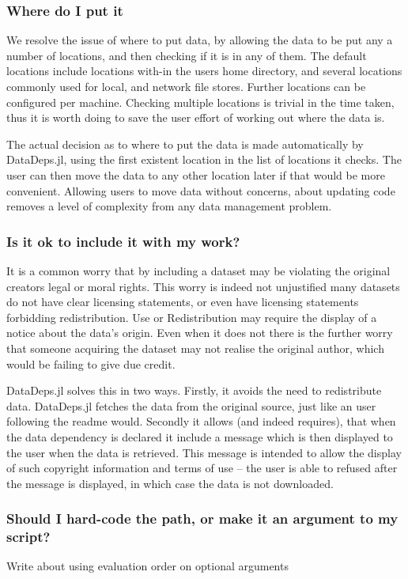 \documentclass{jors}
\begin{document}
\subsubsection{Where do I put it}
We resolve the issue of where to put data, by allowing the data to be put any a number of locations, and then checking if it is in any of them.
The default locations include locations with-in the users home directory, and several locations commonly used for local, and network file stores.
Further locations can be configured per machine.
Checking multiple locations is trivial in the time taken, thus it is worth doing to save the user effort of working out where the data is.

The actual decision as to where to put the data is made automatically by DataDeps.jl, using the first existent location in the list of locations it checks.
The user can then move the data to any other location later if that would be more convenient.
Allowing users to move data without concerns, about updating code removes a level of complexity from any data management problem.


\subsubsection{Is it ok to include it with my work?}
It is a common worry that by including a dataset may be violating the original creators legal or moral rights.
This worry is indeed not unjustified many datasets do not have clear licensing statements,
or even have licensing statements forbidding redistribution.
Use or Redistribution may require the display of a notice about the data's origin.
Even when it does not there is the further worry that someone acquiring the dataset may not realise the original author, which would be failing to give due credit.


DataDeps.jl solves this in two ways.
Firstly, it avoids the need to redistribute data.
DataDeps.jl fetches the data from the original source, just like an user following the readme would.
Secondly it allows (and indeed requires), that when the data dependency is declared it include a message which is then displayed to the user when the data is retrieved.
This message is intended to allow the display of such copyright information and terms of use -- the user is able to refused after the message is displayed, in which case the data is not downloaded.

\subsubsection{Should I hard-code the path, or make it an argument to my script?}
Write about using evaluation order on optional arguments
\end{document}
